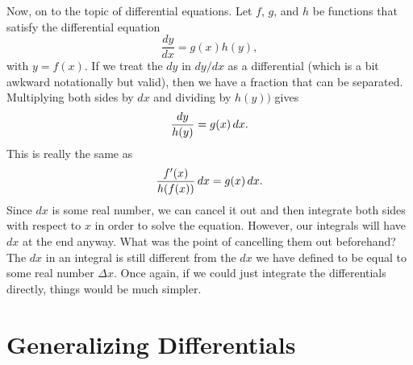 \documentclass[a4paper,12pt]{article}
\begin{document}
Now, on to the topic of differential equations.
Let $f$, $g$, and $h$ be functions that satisfy the differential equation
\begin{equation*}
    \frac{dy}{dx} = g(x)h(y),
\end{equation*}
with $y=f(x)$.
If we treat the $dy$ in $dy/dx$ as a differential (which is a bit awkward notationally but valid), then we have a fraction that can be separated.
Multiplying both sides by $dx$ and dividing by $h(y))$ gives
\begin{equation*}
    \frac{dy}{h(y)} = g(x) \mathop{}\!d x.
\end{equation*}
This is really the same as
\begin{equation*}
    \frac{f'(x)}{h(f(x))} \mathop{}\!d x = g(x) \mathop{}\!d x.
\end{equation*}
Since $dx$ is some real number, we can cancel it out and then integrate both sides with respect to $x$ in order to solve the equation.
However, our integrals will have $dx$ at the end anyway.
What was the point of cancelling them out beforehand?
The $dx$ in an integral is still different from the $dx$ we have defined to be equal to some real number $\Delta x$.
Once again, if we could just integrate the differentials directly, things would be much simpler.

\section{Generalizing Differentials}
\end{document}
